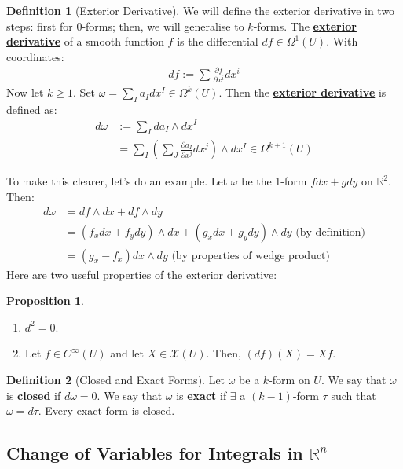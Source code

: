\documentclass[11pt]{scrartcl}
\newcommand{\R}[0]{\mathbb{R}}
\theoremstyle{definition}
\newtheorem{definition}{Definition}
\newtheorem{prop}{Proposition}
\theoremstyle{remark}
\newcommand{\dfn}[1]{\textbf{\underline{#1}}}
\begin{document}
{\begin{definition}[Exterior Derivative]
	We will define the exterior derivative in two steps: first for $0$-forms; then, we will generalise to $k$-forms. The \dfn{exterior derivative} of a smooth function $f$ is the differential $df \in \Omega^1 (U)$. With coordinates: 
	\begin{align*}
		df := \sum \frac{\partial f}{\partial x^i} dx^i
	\end{align*}
	Now let $k \geq 1$. Set $\omega = \sum_{I} a_I dx^I \in \Omega^k(U)$. Then the \dfn{exterior derivative} is defined as: 
	\begin{align*}
		d \omega & := \sum_{I} da_I \wedge dx^I \\
				 & = \sum_{I} \left( \sum_{J} \frac{\partial a_I}{\partial x^j } dx^j \right) \wedge dx^I \in \Omega^{k+1}(U)
	\end{align*}
\end{definition}
To make this clearer, let's do an example. Let $\omega$ be the 1-form $f dx + g dy$ on $\R^2$. Then: 
\begin{align*}
	d \omega & = df \wedge dx + df \wedge dy \\
				&  = (f_x dx + f_y dy ) \wedge dx + (g_x dx + g_y dy ) \wedge dy  \text{ (by definition)} \\
				& = (g_x - f_x) dx \wedge dy \text{ (by properties of wedge product) } 
\end{align*}
Here are two useful properties of the exterior derivative: 
\begin{prop}
	\begin{enumerate}[noitemsep]
		\item $d^2 = 0$. 
		\item Let $f \in C^\infty (U)$ and let $X \in \mathcal{X}(U)$. Then, $(df)(X) = Xf$. 
	\end{enumerate}
\end{prop}

\begin{definition}[Closed and Exact Forms]
	Let $\omega$ be a $k$-form on $U$. We say that $\omega$ is \dfn{closed} if $d\omega =0$. We say that $\omega$ is \dfn{exact} if $\exists$ a $(k-1)$-form $\tau$ such that $\omega = d \tau$. Every exact form is closed. 
\end{definition}


\subsection{Change of Variables for Integrals in $\R^n$}

}
\end{document}

